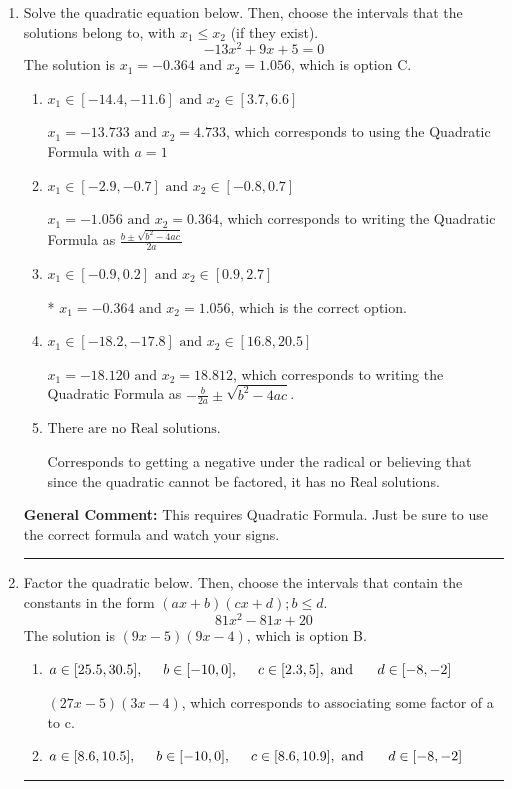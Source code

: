 \documentclass{extbook}[14pt]
\newcommand{\litem}[1]{\item #1

\rule{\textwidth}{0.4pt}}
\begin{document}
\begin{enumerate}\litem{
Solve the quadratic equation below. Then, choose the intervals that the solutions belong to, with $x_1 \leq x_2$ (if they exist).
\[ -13x^{2} +9 x + 5 = 0 \]The solution is \( x_1 = -0.364 \text{ and } x_2 = 1.056 \), which is option C.\begin{enumerate}[label=\Alph*.]
\item \( x_1 \in [-14.4, -11.6] \text{ and } x_2 \in [3.7, 6.6] \)

 $x_1 = -13.733 \text{ and } x_2 = 4.733$, which corresponds to using the Quadratic Formula with $a=1$
\item \( x_1 \in [-2.9, -0.7] \text{ and } x_2 \in [-0.8, 0.7] \)

 $x_1 = -1.056 \text{ and } x_2 = 0.364$, which corresponds to writing the Quadratic Formula as $\frac{b \pm \sqrt{b^2 - 4ac}}{2a}$
\item \( x_1 \in [-0.9, 0.2] \text{ and } x_2 \in [0.9, 2.7] \)

* $x_1 = -0.364 \text{ and } x_2 = 1.056$, which is the correct option.
\item \( x_1 \in [-18.2, -17.8] \text{ and } x_2 \in [16.8, 20.5] \)

 $x_1 = -18.120 \text{ and } x_2 = 18.812$, which corresponds to writing the Quadratic Formula as $-\frac{b}{2a} \pm \sqrt{b^2 - 4ac}$.
\item \( \text{There are no Real solutions.} \)

Corresponds to getting a negative under the radical or believing that since the quadratic cannot be factored, it has no Real solutions.
\end{enumerate}

\textbf{General Comment:} This requires Quadratic Formula. Just be sure to use the correct formula and watch your signs.
}
\litem{
Factor the quadratic below. Then, choose the intervals that contain the constants in the form $(ax+b)(cx+d); b \leq d.$
\[ 81x^{2} -81 x + 20 \]The solution is \( (9x -5)(9x -4) \), which is option B.\begin{enumerate}[label=\Alph*.]
\item \( a \in [25.5, 30.5], \hspace*{5mm} b \in [-10, 0], \hspace*{5mm} c \in [2.3, 5], \text{ and } \hspace*{5mm} d \in [-8, -2] \)

 $(27x -5)(3x -4)$, which corresponds to associating some factor of a to c.
\item \( a \in [8.6, 10.5], \hspace*{5mm} b \in [-10, 0], \hspace*{5mm} c \in [8.6, 10.9], \text{ and } \hspace*{5mm} d \in [-8, -2] \)


\end{enumerate}}
\end{enumerate}
\end{document}
